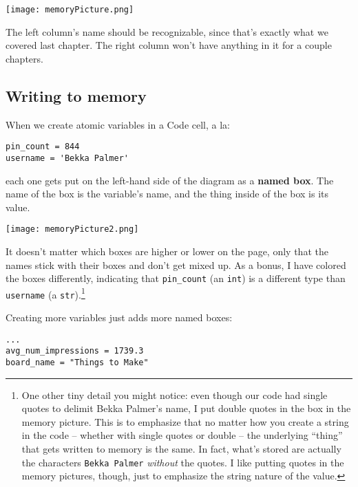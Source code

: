 \begin{center}
\texttt{[image: memoryPicture.png]}
\label{fig:memoryPicture}
\end{center}

The left column's name should be recognizable, since that's exactly what we
covered last chapter. The right column won't have anything in it for a couple
chapters.

\subsection{Writing to memory}

When we create atomic variables in a Code cell, a la:

\begin{Verbatim}[fontsize=\small,samepage=true,frame=single,framesep=3mm]
pin_count = 844
username = 'Bekka Palmer'
\end{Verbatim}

each one gets put on the left-hand side of the diagram as a \textbf{named box}.
The name of the box is the variable's name, and the thing inside of the box is
its value.

\vspace{-.2in}
\begin{center}
\texttt{[image: memoryPicture2.png]}
\end{center}

It doesn't matter which boxes are higher or lower on the page, only that the
names stick with their boxes and don't get mixed up. As a bonus, I have colored
the boxes differently, indicating that \texttt{pin\_count} (an \texttt{int}) is
a different type than \texttt{username} (a \texttt{str}).\footnote{One other
tiny detail you might notice: even though our code had single quotes to delimit
Bekka Palmer's name, I put double quotes in the box in the memory picture. This
is to emphasize that no matter how you create a string in the code -- whether
with single quotes or double -- the underlying ``thing'' that gets written to
memory is the same. In fact, what's stored are actually the characters
\texttt{Bekka Palmer} \textit{without} the quotes. I like putting quotes in the
memory pictures, though, just to emphasize the string nature of the value.}

Creating more variables just adds more named boxes:

\begin{Verbatim}[fontsize=\small,samepage=true,frame=single,framesep=3mm]
...
avg_num_impressions = 1739.3
board_name = "Things to Make"
\end{Verbatim}

